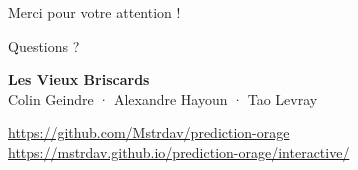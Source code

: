 \documentclass[aspectratio=169,10pt]{beamer}
\begin{document}
\begin{frame}[standout]
Merci pour votre attention !

\vspace{1em}
\large Questions ?

\vspace{1.5em}
\normalsize
\textbf{Les Vieux Briscards}\\
\small Colin Geindre · Alexandre Hayoun · Tao Levray

\vspace{1.5em}
\footnotesize
\url{https://github.com/Mstrdav/prediction-orage}\\
\url{https://mstrdav.github.io/prediction-orage/interactive/}
\end{frame}
\end{document}
